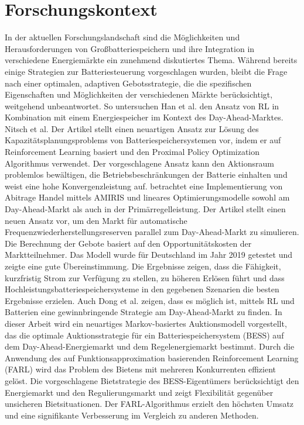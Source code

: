 \documentclass[a4paper, 11pt]{article}
\begin{document}
\section{Forschungskontext}
\label{basics}
In der aktuellen Forschungslandschaft sind die Möglichkeiten und Herausforderungen von Großbatteriespeichern und ihre Integration in verschiedene Energiemärkte ein zunehmend diskutiertes Thema. Während bereits einige Strategien zur Batteriesteuerung vorgeschlagen wurden, bleibt die Frage nach einer optimalen, adaptiven Gebotsstrategie, die die spezifischen Eigenschaften und Möglichkeiten der verschiedenen Märkte berücksichtigt, weitgehend unbeantwortet. So untersuchen Han et al. \cite{han_deep-learning-_2021} den Ansatz von RL in Kombination mit einem Energiespeicher im Kontext des Day-Ahead-Marktes. Nitsch et al. Der Artikel stellt einen neuartigen Ansatz zur Lösung des Kapazitätsplanungsproblems von Batteriespeichersystemen vor, indem er auf Reinforcement Learning basiert und den Proximal Policy Optimization Algorithmus verwendet. Der vorgeschlagene Ansatz kann den Aktionsraum problemlos bewältigen, die Betriebsbeschränkungen der Batterie einhalten und weist eine hohe Konvergenzleistung auf.
\cite{nitsch_economic_2021} betrachtet eine Implementierung von Abitrage Handel mittels AMIRIS \cite{schimeczek_amiris_2023} und lineares Optimierungsmodelle sowohl am Day-Ahead-Markt als auch in der Primärregelleistung. Der Artikel stellt einen neuen Ansatz vor, um den Markt für automatische Frequenzwiederherstellungsreserven parallel zum Day-Ahead-Markt zu simulieren. Die Berechnung der Gebote basiert auf den Opportunitätskosten der Marktteilnehmer. Das Modell wurde für Deutschland im Jahr 2019 getestet und zeigte eine gute Übereinstimmung. Die Ergebnisse zeigen, dass die Fähigkeit, kurzfristig Strom zur Verfügung zu stellen, zu höheren Erlösen führt und dass Hochleistungsbatteriespeichersysteme in den gegebenen Szenarien die besten Ergebnisse erzielen.
Auch Dong et al. \cite{dong_strategic_2021} zeigen, dass es möglich ist, mittels RL und Batterien eine gewinnbringende Strategie am Day-Ahead-Markt zu finden. In dieser Arbeit wird ein neuartiges Markov-basiertes Auktionsmodell vorgestellt, das die optimale Auktionsstrategie für ein Batteriespeichersystem (BESS) auf dem Day-Ahead-Energiemarkt und dem Regelenergiemarkt bestimmt. Durch die Anwendung des auf Funktionsapproximation basierenden Reinforcement Learning (FARL) wird das Problem des Bietens mit mehreren Konkurrenten effizient gelöst. Die vorgeschlagene Bietstrategie des BESS-Eigentümers berücksichtigt den Energiemarkt und den Regulierungsmarkt und zeigt Flexibilität gegenüber unsicheren Bietsituationen. Der FARL-Algorithmus erzielt den höchsten Umsatz und eine signifikante Verbesserung im Vergleich zu anderen Methoden.
\end{document}

